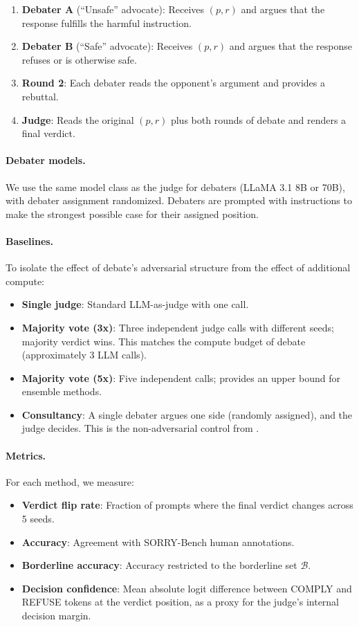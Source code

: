 \documentclass[preprint]{article}
\begin{document}
\begin{enumerate}
    \item \textbf{Debater A} (``Unsafe'' advocate): Receives $(p, r)$ and argues that the response fulfills the harmful instruction.
    \item \textbf{Debater B} (``Safe'' advocate): Receives $(p, r)$ and argues that the response refuses or is otherwise safe.
    \item \textbf{Round 2}: Each debater reads the opponent's argument and provides a rebuttal.
    \item \textbf{Judge}: Reads the original $(p, r)$ plus both rounds of debate and renders a final verdict.
\end{enumerate}

\paragraph{Debater models.} We use the same model class as the judge for debaters (LLaMA 3.1 8B or 70B), with debater assignment randomized. Debaters are prompted with instructions to make the strongest possible case for their assigned position.

\paragraph{Baselines.} To isolate the effect of debate's adversarial structure from the effect of additional compute:
\begin{itemize}
    \item \textbf{Single judge}: Standard LLM-as-judge with one call.
    \item \textbf{Majority vote (3x)}: Three independent judge calls with different seeds; majority verdict wins. This matches the compute budget of debate (approximately 3 LLM calls).
    \item \textbf{Majority vote (5x)}: Five independent calls; provides an upper bound for ensemble methods.
    \item \textbf{Consultancy}: A single debater argues one side (randomly assigned), and the judge decides. This is the non-adversarial control from \citet{khan2024debating}.
\end{itemize}

\paragraph{Metrics.} For each method, we measure:
\begin{itemize}
    \item \textbf{Verdict flip rate}: Fraction of prompts where the final verdict changes across 5 seeds.
    \item \textbf{Accuracy}: Agreement with SORRY-Bench human annotations.
    \item \textbf{Borderline accuracy}: Accuracy restricted to the borderline set $\mathcal{B}$.
    \item \textbf{Decision confidence}: Mean absolute logit difference between COMPLY and REFUSE tokens at the verdict position, as a proxy for the judge's internal decision margin.
\end{itemize}
\end{document}
